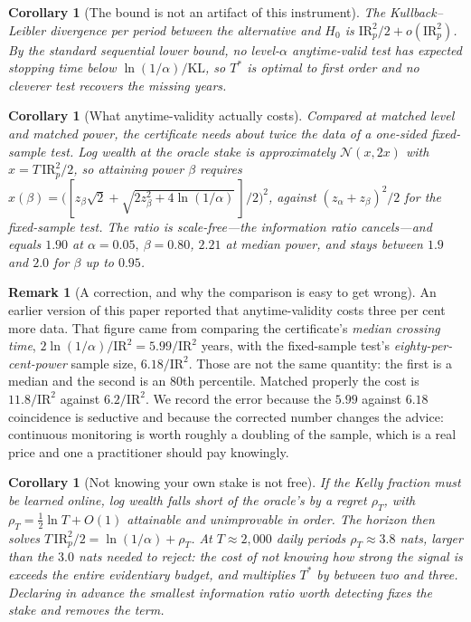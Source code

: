 \documentclass{article}
\theoremstyle{plain}
\newtheorem{corollary}[theorem]{Corollary}
\theoremstyle{definition}
\newtheorem{remark}[theorem]{Remark}
\begin{document}
\begin{corollary}[The bound is not an artifact of this instrument]
\label{cor:optimal}
The Kullback--Leibler divergence per period between the alternative and $H_0$ is
$\mathrm{IR}_p^2/2+o(\mathrm{IR}_p^2)$. By the standard sequential lower bound, no
level-$\alpha$ anytime-valid test has expected stopping time below
$\ln(1/\alpha)/\mathrm{KL}$, so $T^\ast$ is optimal to first order and no cleverer test
recovers the missing years.
\end{corollary}

\begin{corollary}[What anytime-validity actually costs]
\label{cor:free}
Compared at matched level \emph{and matched power}, the certificate needs about twice the data
of a one-sided fixed-sample test. Log wealth at the oracle stake is approximately
$\mathcal{N}(x, 2x)$ with $x = T\,\mathrm{IR}_p^2/2$, so attaining power $\beta$ requires
$x(\beta) = \big([z_\beta\sqrt2 + \sqrt{2z_\beta^2+4\ln(1/\alpha)}\,]/2\big)^2$, against
$(z_\alpha+z_\beta)^2/2$ for the fixed-sample test. The ratio is scale-free---the information
ratio cancels---and equals $1.90$ at $\alpha=0.05,\ \beta=0.80$, $2.21$ at median power, and
stays between $1.9$ and $2.0$ for $\beta$ up to $0.95$.
\end{corollary}

\begin{remark}[A correction, and why the comparison is easy to get wrong]
\label{rem:correction}
An earlier version of this paper reported that anytime-validity costs three per cent more
data. That figure came from comparing the certificate's \emph{median crossing time},
$2\ln(1/\alpha)/\mathrm{IR}^2 = 5.99/\mathrm{IR}^2$ years, with the fixed-sample test's
\emph{eighty-per-cent-power} sample size, $6.18/\mathrm{IR}^2$. Those are not the same
quantity: the first is a median and the second is an $80$th percentile. Matched properly the
cost is $11.8/\mathrm{IR}^2$ against $6.2/\mathrm{IR}^2$. We record the error because the
$5.99$ against $6.18$ coincidence is seductive and because the corrected number changes the
advice: continuous monitoring is worth roughly a doubling of the sample, which is a real price
and one a practitioner should pay knowingly.
\end{remark}

\begin{corollary}[Not knowing your own stake is not free]
\label{cor:regret}
If the Kelly fraction must be learned online, log wealth falls short of the oracle's by a
regret $\rho_T$, with $\rho_T=\tfrac12\ln T+O(1)$ attainable and unimprovable in order. The
horizon then solves $T\,\mathrm{IR}_p^2/2=\ln(1/\alpha)+\rho_T$. At $T\approx2{,}000$ daily
periods $\rho_T\approx3.8$ nats, larger than the $3.0$ nats needed to reject: the cost of
not knowing how strong the signal is exceeds the entire evidentiary budget, and multiplies
$T^\ast$ by between two and three. Declaring in advance the smallest information ratio worth detecting fixes
the stake and removes the term.
\end{corollary}
\end{document}
